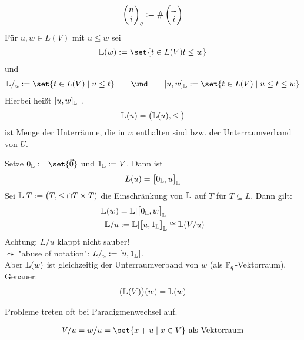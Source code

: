 \begin{notation}
	\begin{align*}
		\begin{pmatrix}
			n\\
			i
		\end{pmatrix}_q
		:=\#\begin{pmatrix}
			\mathbb{L}\\
			i
		\end{pmatrix}
	\end{align*}
	Für $u,w\in L(V)$ mit $u\leq w$ sei
	\begin{align*}
		\L(w):=\set{t\in L(V)\mit t\leq w}
	\end{align*}
	und
	\begin{align*}
		\L/_u:=\set{t\in L(V)\mid u\leq t}
		\qquad\und\qquad
		[u,w]_\L:=\set{t\in L(V)\mid u\leq t\leq w}
	\end{align*}
	Hierbei heißt $[u,w]_{\mathbb{L}}$ .
	\begin{align*}
		\mathbb{L}(u)=\big(\mathbb{L}(u),\leq\big)
	\end{align*}
	ist Menge der Unterräume, die in $w$ enthalten sind bzw. der Unterraumverband von $U$.
\end{notation}

	Setze $0_\L:=\set{\vec{0}}$ und $1_{\mathbb{L}}:=V$.
	Dann ist
	\begin{align*}
		L(u)=\big[0_{\mathbb{L}},u\big]_{\mathbb{L}}
	\end{align*}
	Sei $\mathbb{L}|T:=\big(T,\leq\cap T\times T)$ die Einschränkung von $\mathbb{L}$ auf $T$ für $T\subseteq L$.
	Dann gilt:
	\begin{align*}
		\mathbb{L}(w)&=\mathbb{L}|\big[0_{\mathbb{L}},w\big]_{\mathbb{L}}\\
		\mathbb{L}/u&:=\mathbb{L}|\big[u,1_{\mathbb{L}}\big]_{\mathbb{L}}\cong\mathbb{L}(V/u)
	\end{align*}
	Achtung: $L/u$ klappt nicht sauber!\\
	$\leadsto$ "abuse of notation": $L/_u:=[u,1_{\mathbb{L}}]$.\\
	Aber $\mathbb{L}(w)$ ist gleichzeitig der Unterraumverband von $w$ (als $\mathbb{F}_q$-Vektorraum).
Genauer:
\begin{align*}
	\big(\mathbb{L}(V)\big)(w)=\mathbb{L}(w)
\end{align*}

Probleme treten oft bei Paradigmenwechsel auf.

\begin{erinnerung}
	\begin{align*}
		V/u=w/u=\set{x+u\mid x\in V}\text{ als Vektorraum}
	\end{align*}
\end{erinnerung}

